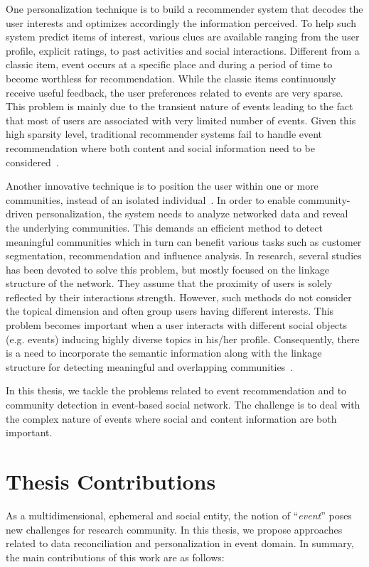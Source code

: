 One personalization technique is to build a recommender system that decodes the user interests and optimizes accordingly the information perceived. To help such system predict items of interest, various clues are available ranging from the user profile, explicit ratings, to past activities and social interactions. Different from a classic item, event occurs at a specific place and during a period of time to become worthless for recommendation. While the classic items continuously receive useful feedback, the user preferences related to events are very sparse. This problem is mainly due to the transient nature of events leading to the fact that most of users are associated with very limited number of events. Given this high sparsity level, traditional recommender systems fail to handle event recommendation where both content and social information need to be considered~\cite{Cornelis:IICAI05}.  

Another innovative technique is to position the user within one or more communities, instead of an isolated individual~\cite{Paliouras:2012}. In order to enable community-driven personalization, the system needs to analyze networked data and reveal the underlying communities. This demands an efficient method to detect meaningful communities which in turn can benefit various tasks such as customer segmentation, recommendation and influence analysis. In research, several studies has been devoted to solve this problem, but mostly focused on the linkage structure of the network. They assume that the proximity of users is solely reflected by their interactions strength. However, such methods do not consider the topical dimension and often group users having different interests. This problem becomes important when a user interacts with different social objects (e.g. events) inducing highly diverse topics in his/her profile. Consequently, there is a need to incorporate the semantic information along with the linkage structure for detecting meaningful and overlapping communities~\cite{Juan:cason11,Zhongying:12}. 

In this thesis, we tackle the problems related to event recommendation and to community detection in event-based social network. The challenge is to deal with the complex nature of events where social and content information are both important.

\section{Thesis Contributions}      \label{sec:contributions}
As a multidimensional, ephemeral and social entity, the notion of ``\emph{event}'' poses new challenges for research community. In this thesis, we propose approaches related to data reconciliation and personalization in event domain. In summary, the main contributions of this work are as follows:

